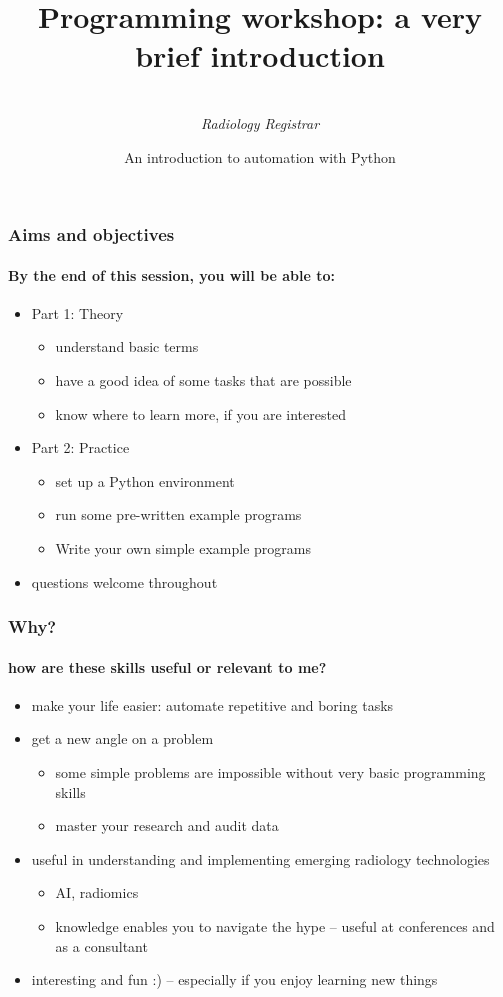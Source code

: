 \documentclass{beamer}
\title[Programming workshop]{Programming workshop: a very brief introduction}
\author{
	\sc{Mark Thurston}\\
    \textit{Radiology Registrar}
}
\institute{
	\textit{Peninsula Radiology Academy}\\
    \textit{Plymouth}
}
\date[April 2018]{An introduction to automation with Python} %
\begin{document}
    \begin{frame}[plain]
	    \titlepage
    \end{frame}


    \begin{frame}
	    \frametitle{Aims and objectives}
	    \framesubtitle{By the end of this session, you will be able to:}

	    \begin{itemize}
		    \item Part 1: Theory
			    \begin{itemize}
				    \item understand basic terms
				    \item have a good idea of some tasks that are possible
				    \item know where to learn more, if you are interested
			    \end{itemize}
	    \end{itemize}
	    \begin{itemize}
		    \item Part 2: Practice
			    \begin{itemize}
				    \item set up a Python environment
				    \item run some pre-written example programs
				    \item Write your own simple example programs
			    \end{itemize}
	    \end{itemize}
	    \begin{itemize}
		    \item questions welcome throughout
	    \end{itemize}
    \end{frame}

    \begin{frame}
	    \frametitle{Why?}
	    \framesubtitle{how are these skills useful or relevant to me?}
	    \begin{itemize}
		    \item make your life easier: automate repetitive and boring tasks
		    \item get a new angle on a problem
			    \begin{itemize}
				    \item some simple problems are impossible without very basic programming skills
				    \item master your research and audit data
			    \end{itemize}
		    \item useful in understanding and implementing emerging radiology technologies
			    \begin{itemize}
				    \item AI, radiomics
				    \item knowledge enables you to navigate the hype -- useful at conferences and as a consultant
			    \end{itemize}
		    \item interesting and fun :) -- especially if you enjoy learning new things
	    \end{itemize}
    \end{frame}
\end{document}
